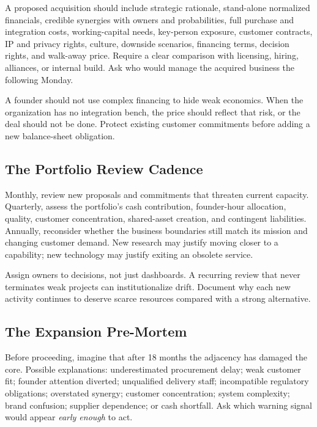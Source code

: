 A proposed acquisition should include strategic rationale, stand-alone normalized financials, credible synergies with owners and probabilities, full purchase and integration costs, working-capital needs, key-person exposure, customer contracts, IP and privacy rights, culture, downside scenarios, financing terms, decision rights, and walk-away price. Require a clear comparison with licensing, hiring, alliances, or internal build. Ask who would manage the acquired business the following Monday.

A founder should not use complex financing to hide weak economics. When the organization has no integration bench, the price should reflect that risk, or the deal should not be done. Protect existing customer commitments before adding a new balance-sheet obligation.

\subsection{The Portfolio Review Cadence}
\label{sec:portfolio_review_cadence}

Monthly, review new proposals and commitments that threaten current capacity. Quarterly, assess the portfolio's cash contribution, founder-hour allocation, quality, customer concentration, shared-asset creation, and contingent liabilities. Annually, reconsider whether the business boundaries still match its mission and changing customer demand. New research may justify moving closer to a capability; new technology may justify exiting an obsolete service.

Assign owners to decisions, not just dashboards. A recurring review that never terminates weak projects can institutionalize drift. Document why each new activity continues to deserve scarce resources compared with a strong alternative.

\subsection{The Expansion Pre-Mortem}
\label{sec:expansion_pre_mortem}

Before proceeding, imagine that after 18 months the adjacency has damaged the core. Possible explanations: underestimated procurement delay; weak customer fit; founder attention diverted; unqualified delivery staff; incompatible regulatory obligations; overstated synergy; customer concentration; system complexity; brand confusion; supplier dependence; or cash shortfall. Ask which warning signal would appear \textit{early enough} to act.

